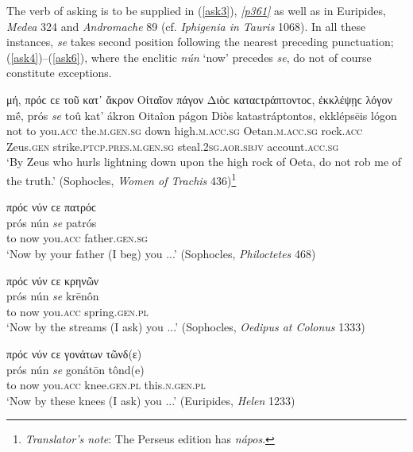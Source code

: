 The verb of asking is to be supplied in (\ref{ask3}), \hyperlink{p361}{\emph{[p361]}} as well as in Euripides, \textit{Medea} 324 and \textit{Andromache} 89 (cf. \textit{Iphigenia in Tauris} 1068). In all these instances, \textit{se} takes second position following the nearest preceding punctuation; (\ref{ask4})--(\ref{ask6}), where the enclitic \textit{nún} `now' precedes \textit{se}, do not of course constitute exceptions.

\begin{exe}
\ex μή, πρόϲ ϲε τοῦ κατ᾽ ἄκρον Οἰταῖον πάγον Διὸϲ καταϲτράπτοντοϲ, ἐκκλέψῃϲ λόγον\\
\gll mḗ, prós \emph{se} toû kat' ákron Oitaîon págon Diòs katastráptontos, ekklépsēis lógon\\
not to you.\textsc{acc} the.\textsc{m.gen.sg} down high.\textsc{m.acc.sg} Oetan\textsc{.m.acc.sg} rock.\textsc{acc} Zeus.\textsc{gen} strike.\textsc{ptcp.pres.m.gen.sg} steal.\textsc{2sg.aor.sbjv} account.\textsc{acc.sg}\\
\trans `By Zeus who hurls lightning down upon the high rock of Oeta, do not rob me of the truth.' (Sophocles, \textit{Women of Trachis} 436)\footnote{\emph{Translator's note}: The Perseus
edition has \textit{nápos}.}
\label{ask3}
\end{exe}

\begin{exe}
\ex πρόϲ νύν ϲε πατρόϲ\\
\gll prós nún \emph{se} patrós\\
to now you.\textsc{acc} father.\textsc{gen.sg}\\
\trans `Now by your father (I beg) you ...' (Sophocles, \textit{Philoctetes} 468)
\label{ask4}
\end{exe}

\begin{exe}
\ex πρόϲ νύν ϲε κρηνῶν\\
\gll prós nún \emph{se} krēnôn\\
to now you.\textsc{acc} spring.\textsc{gen.pl}\\
\trans `Now by the streams (I ask) you ...' (Sophocles, \textit{Oedipus at Colonus} 1333)
\label{ask5}
\end{exe}

\begin{exe}
\ex πρόϲ νύν ϲε γονάτων τῶνδ(ε)\\
\gll prós nún \emph{se} gonátōn tônd(e)\\
to now you.\textsc{acc} knee.\textsc{gen.pl} this.\textsc{n.gen.pl}\\
\trans `Now by these knees (I ask) you ...' (Euripides, \textit{Helen} 1233)
\label{ask6}
\end{exe}

